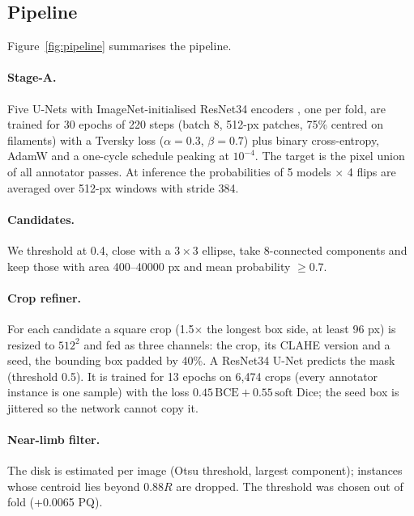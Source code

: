 \documentclass[sigconf]{acmart}
\begin{document}
\subsection{Pipeline}
Figure~\ref{fig:pipeline} summarises the pipeline.
\paragraph{Stage-A.} Five U-Nets \cite{ronneberger2015unet} with ImageNet-initialised ResNet34 encoders \cite{he2016resnet}, one per fold, are trained for 30 epochs of 220 steps (batch 8, 512-px patches, 75\% centred on filaments) with a Tversky loss ($\alpha{=}0.3$, $\beta{=}0.7$) \cite{salehi2017tversky} plus binary cross-entropy, AdamW \cite{loshchilov2019decoupled} and a one-cycle schedule \cite{smith2017superconvergence} peaking at $10^{-4}$. The target is the pixel union of all annotator passes. At inference the probabilities of 5 models $\times$ 4 flips are averaged over 512-px windows with stride 384.

\paragraph{Candidates.} We threshold at 0.4, close with a $3{\times}3$ ellipse, take 8-connected components and keep those with area 400--40000 px and mean probability $\ge 0.7$.

\paragraph{Crop refiner.} For each candidate a square crop (1.5$\times$ the longest box side, at least 96 px) is resized to $512^2$ and fed as three channels: the crop, its CLAHE version \cite{zuiderveld1994clahe} and a seed, the bounding box padded by 40\%. A ResNet34 U-Net \cite{iakubovskii2019smp} predicts the mask (threshold 0.5). It is trained for 13 epochs on 6,474 crops (every annotator instance is one sample) with the loss $0.45\,\text{BCE}+0.55\,\text{soft Dice}$; the seed box is jittered so the network cannot copy it.

\paragraph{Near-limb filter.} The disk is estimated per image (Otsu threshold, largest component); instances whose centroid lies beyond $0.88R$ are dropped. The threshold was chosen out of fold (+0.0065 PQ).
\end{document}
